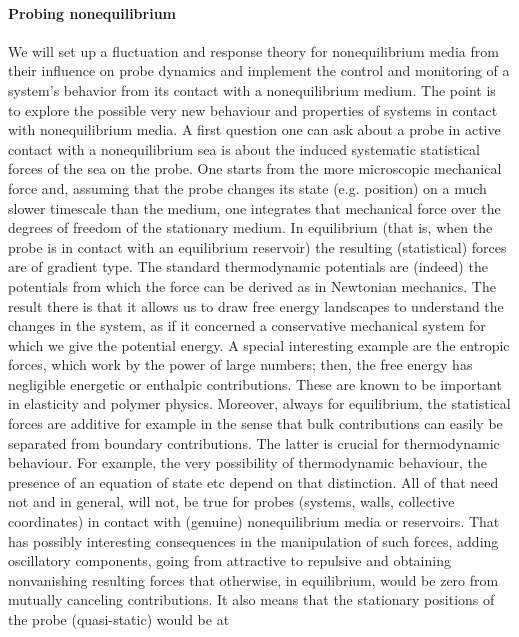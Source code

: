 \paragraph{Probing nonequilibrium}

We will set up a fluctuation and response theory for nonequilibrium media from their
influence on probe dynamics and implement the control and monitoring of a system's behavior
from its contact with a nonequilibrium medium.
%
The point is to explore the
possible very new behaviour and properties of systems in contact with nonequilibrium
media.
%
A first question one can ask about a probe in active contact with a nonequilibrium
sea is about the induced systematic statistical forces of the sea on the probe.
%
One starts from the more microscopic mechanical force and, assuming that the probe changes
its state (e.g. position) on a much slower timescale than the medium, one integrates that
mechanical force over the degrees of freedom of the stationary medium.
%
In equilibrium (that
is, when the probe is in contact with an equilibrium reservoir) the resulting (statistical)
forces are of gradient type.  The standard thermodynamic potentials are (indeed) the
potentials from which the force can be derived as in Newtonian mechanics. The result there
is that it allows us to draw free energy landscapes to understand the changes in the system,
as if it concerned a conservative mechanical system for which we give the potential energy.
A special interesting example are the entropic forces, which work by the power of large
numbers; then, the free energy has negligible energetic or enthalpic contributions.  These
are known to be important in elasticity and polymer physics. Moreover, always for
equilibrium, the statistical forces are additive for example in the sense that bulk
contributions can easily be separated from boundary contributions.  The latter is crucial
for thermodynamic behaviour.  For example, the very possibility of thermodynamic behaviour,
the presence of an equation of state etc depend on that distinction.  All of that need not
and in general, will not, be true for probes (systems, walls, collective coordinates) in
contact with (genuine) nonequilibrium media or reservoirs. That has possibly interesting
consequences in the manipulation of such forces, adding oscillatory components, going from
attractive to repulsive and obtaining nonvanishing resulting forces that otherwise, in
equilibrium, would be zero from mutually canceling contributions.
%
It also means that the stationary positions of the probe (quasi-static) would be at

